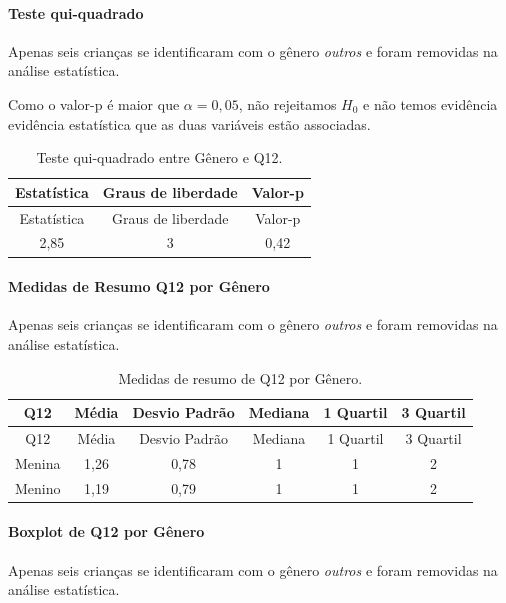 \documentclass[]{article}
\let\oldparagraph\paragraph
\renewcommand{\paragraph}[1]{\oldparagraph{#1}\mbox{}}
\begin{document}
\hypertarget{teste-qui-quadrado-3}{%
\paragraph{Teste qui-quadrado}\label{teste-qui-quadrado-3}}

Apenas seis crianças se identificaram com o gênero \emph{outros} e foram removidas na análise estatística.

Como o valor-p é maior que \(\alpha=0,05\), não rejeitamos \(H_0\) e não temos evidência evidência estatística que as duas variáveis estão associadas.

\begin{longtable}[]{@{}ccc@{}}
\caption{\label{tab:unnamed-chunk-26}Teste qui-quadrado entre Gênero e Q12.}\tabularnewline
\toprule
Estatística & Graus de liberdade & Valor-p\tabularnewline
\midrule
\endfirsthead
\toprule
Estatística & Graus de liberdade & Valor-p\tabularnewline
\midrule
\endhead
2,85 & 3 & 0,42\tabularnewline
\bottomrule
\end{longtable}

\cleardoublepage

\hypertarget{medidas-de-resumo-q12-por-guxeanero}{%
\paragraph{Medidas de Resumo Q12 por Gênero}\label{medidas-de-resumo-q12-por-guxeanero}}

Apenas seis crianças se identificaram com o gênero \emph{outros} e foram removidas na análise estatística.

\begin{longtable}[]{@{}cccccc@{}}
\caption{\label{tab:unnamed-chunk-27}Medidas de resumo de Q12 por Gênero.}\tabularnewline
\toprule
Q12 & Média & Desvio Padrão & Mediana & 1 Quartil & 3 Quartil\tabularnewline
\midrule
\endfirsthead
\toprule
Q12 & Média & Desvio Padrão & Mediana & 1 Quartil & 3 Quartil\tabularnewline
\midrule
\endhead
Menina & 1,26 & 0,78 & 1 & 1 & 2\tabularnewline
Menino & 1,19 & 0,79 & 1 & 1 & 2\tabularnewline
\bottomrule
\end{longtable}

\hypertarget{boxplot-de-q12-por-guxeanero}{%
\paragraph{Boxplot de Q12 por Gênero}\label{boxplot-de-q12-por-guxeanero}}

Apenas seis crianças se identificaram com o gênero \emph{outros} e foram removidas na análise estatística.
\end{document}
